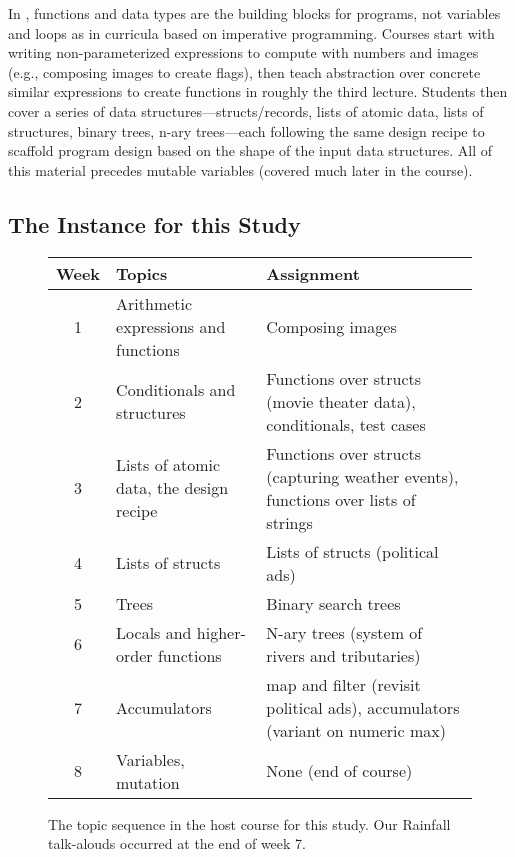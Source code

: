In \htdp, functions and data types are the building blocks for
programs, not variables and loops as in curricula based on
imperative programming. Courses start with writing non-parameterized
expressions to compute with numbers and images (e.g., composing images
to create flags), then teach abstraction over concrete similar
expressions to create functions in roughly the third lecture.
Students then cover a series of data structures---structs/records,
lists of atomic data, lists of structures, binary trees, n-ary
trees---each following the same design recipe to scaffold program
design based on the shape of the input data structures.  All of this
material precedes mutable variables (covered much later in the
course).

\subsection*{The \htdp Instance for this Study}

\begin{figure}
\begin{tabular}{|c|p{2.5cm}|p{4cm}|} \hline
{\bf Week} & {\bf Topics} & {\bf Assignment} \\ \hline
1 & Arithmetic expressions and functions & Composing images \\ \hline
2 & Conditionals and structures & Functions over structs (movie
                                  theater data),
                                  conditionals, test cases \\ \hline
3 & Lists of atomic data, the design recipe & Functions over
                                         structs (capturing
                                         weather events), functions
                                                over lists of strings\\ \hline
4 & Lists of structs & Lists of structs (political ads) \\ \hline
5 & Trees & Binary search trees \\ \hline
6 & Locals and higher-order functions & N-ary trees (system of rivers
                                        and tributaries) \\ \hline
7 & Accumulators & map and filter (revisit political ads),
                   accumulators (variant on numeric max) \\ \hline
8 & Variables, mutation & None (end of course) \\ \hline
\end{tabular}
\caption{The topic sequence in the host course for this study.  Our
  Rainfall talk-alouds occurred at the end of week 7.}
\label{f:course-topics}
\end{figure}

